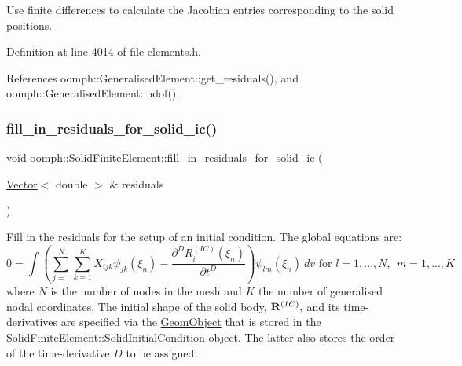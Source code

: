 Use finite differences to calculate the Jacobian entries corresponding to the solid positions. 



Definition at line 4014 of file elements.\+h.



References oomph\+::\+Generalised\+Element\+::get\+\_\+residuals(), and oomph\+::\+Generalised\+Element\+::ndof().

\mbox{\label{classoomph_1_1SolidFiniteElement_a669d18beef5d517d01e97685a43c4a96}} 
\subsubsection{\texorpdfstring{fill\+\_\+in\+\_\+residuals\+\_\+for\+\_\+solid\+\_\+ic()}{fill\_in\_residuals\_for\_solid\_ic()}}
{\footnotesize\ttfamily void oomph\+::\+Solid\+Finite\+Element\+::fill\+\_\+in\+\_\+residuals\+\_\+for\+\_\+solid\+\_\+ic (\begin{DoxyParamCaption}\item[{\hyperlink{classoomph_1_1Vector}{Vector}$<$ double $>$ \&}]{residuals }\end{DoxyParamCaption})\hspace{0.3cm}{\ttfamily [inline]}}



Fill in the residuals for the setup of an initial condition. The global equations are\+: \[ 0 = \int \left( \sum_{j=1}^N \sum_{k=1}^K X_{ijk} \psi_{jk}(\xi_n) - \frac{\partial^D R^{(IC)}_i(\xi_n)}{\partial t^D} \right) \psi_{lm}(\xi_n) \ dv \mbox{ \ \ \ \ for \ \ \ $l=1,...,N, \ \ m=1,...,K$} \] where $ N $ is the number of nodes in the mesh and $ K $ the number of generalised nodal coordinates. The initial shape of the solid body, $ {\bf R}^{(IC)},$ and its time-\/derivatives are specified via the {\ttfamily \hyperlink{classoomph_1_1GeomObject}{Geom\+Object}} that is stored in the {\ttfamily Solid\+Finite\+Element\+::\+Solid\+Initial\+Condition} object. The latter also stores the order of the time-\/derivative $ D $ to be assigned. 



